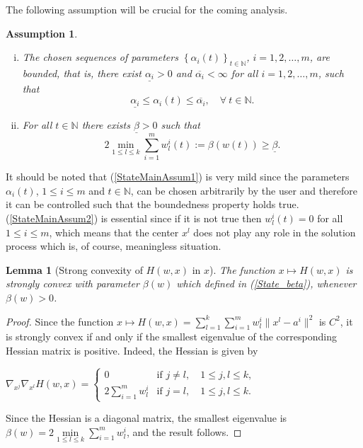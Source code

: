\documentclass[12pt]{article}
\numberwithin{equation}{section}
\newtheorem{lemma}{Lemma}[proposition]
\newtheorem{assumption}{Assumption}
\begin{document}
The following assumption will be crucial for the coming analysis.
\begin{assumption} \label{StateMainAssum}
\begin{enumerate}[(i)] 
	\item The chosen sequences of parameters $\left\lbrace \alpha_i(t) \right\rbrace_{t \in \mathbb{N}}$, $i=1,2, \ldots, m$, are bounded, that is, there exist $\underline{\alpha_i} > 0$ and $\overline{\alpha_i} < \infty$ for all $i=1,2, \ldots, m$, such that
		\begin{equation}
			\underline{\alpha_i} \leq \alpha_i(t) \leq \overline{\alpha_i}, \quad \forall \: t \in \mathbb{N}.
		\end{equation}		 \label{StateMainAssum1}
	\item For all $t \in \mathbb{N}$ there exists $\underline{\beta} > 0$ such that
		\begin{equation}
			2 \min\limits_{1 \leq l \leq k} \sum\limits_{i=1}^{m} w^i_l(t) := \beta(w(t)) \geq \underline{\beta}. \label{State_beta}
		\end{equation}		 \label{StateMainAssum2}
\end{enumerate}
\end{assumption}
It should be noted that (\ref{StateMainAssum1}) is very mild since the parameters $\alpha_i(t)$, $1 \leq i \leq m$ and $t \in \mathbb{N}$, can be chosen arbitrarily by the user and therefore it can be controlled such that the boundedness property holds true. (\ref{StateMainAssum2}) is essential since if it is not true then $w^i_l(t)=0$ for all $1 \leq i \leq m$, which means that the center $x^l$ does not play any role in the solution process which is, of course, meaningless situation.

\begin{lemma}[Strong convexity of $H(w,x)$ in $x$] \label{StateEq14}
The function $x \mapsto H(w,x)$ is strongly convex with parameter $\beta(w)$ which defined in (\ref{State_beta}), whenever $\beta(w) > 0$.
\end{lemma}

\begin{proof}
Since the function $x \mapsto H(w,x) = 
\sum\limits_{l=1}^{k} \sum\limits_{i=1}^{m} w^i_l \|x^l - a^i\|^2$ is $C^2$, it is strongly convex if and only if the smallest eigenvalue of the corresponding Hessian matrix is positive. Indeed, the Hessian is given by

\begin{center}
$\nabla_{x^j} \nabla_{x^l} H(w,x) = 
\begin{cases} 0 &\mbox{if } j \neq l, \quad 1 \leq j,l \leq k ,
\\ 2\sum\limits_{i=1}^{m} w^i_l &\mbox{if } j = l, \quad 1 \leq j,l \leq k. \end{cases} $
\end{center}

Since the Hessian is a diagonal matrix, the smallest eigenvalue is $\beta(w) = 2\min\limits_{1 \leq l \leq k} \sum\limits_{i=1}^{m} w^i_l$, and the result follows.
\end{proof}
\end{document}
